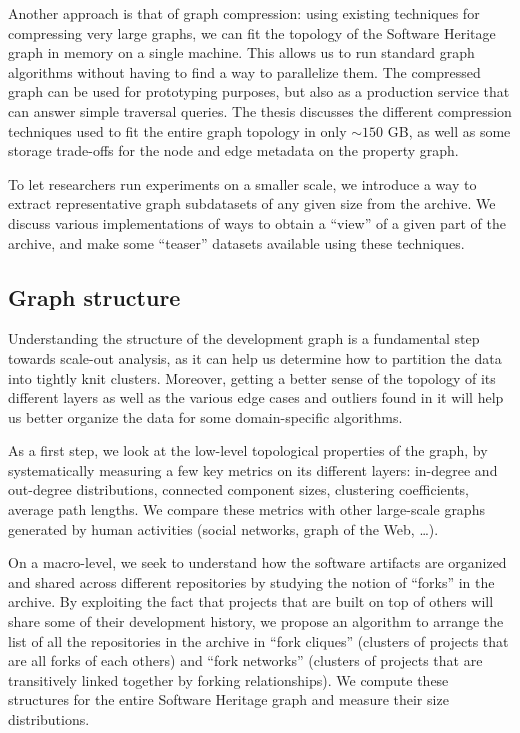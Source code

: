 Another approach is that of graph compression: using existing techniques for
compressing very large graphs, we can fit the topology of the Software Heritage
graph in memory on a single machine. This allows us to run standard graph
algorithms without having to find a way to parallelize them. The compressed
graph can be used for prototyping purposes, but also as a production service
that can answer simple traversal queries. The thesis discusses the different
compression techniques used to fit the entire graph topology in only $\sim150$
GB, as well as some storage trade-offs for the node and edge metadata on the
property graph.

To let researchers run experiments on a smaller scale, we introduce a way to
extract representative graph subdatasets of any given size from the archive. We
discuss various implementations of ways to obtain a ``view'' of a given part of
the archive, and make some ``teaser'' datasets available using these techniques.

\subsection*{Graph structure}

Understanding the structure of the development graph is a fundamental step
towards scale-out analysis, as it can help us determine how to partition the
data into tightly knit clusters. Moreover, getting a better sense of the
topology of its different layers as well as the various edge cases and outliers
found in it will help us better organize the data for some domain-specific
algorithms.

As a first step, we look at the low-level topological properties of the graph,
by systematically measuring a few key metrics on its different layers:
in-degree and out-degree distributions, connected component sizes, clustering
coefficients, average path lengths. We compare these metrics with other
large-scale graphs generated by human activities (social networks, graph of the
Web, …).

On a macro-level, we seek to understand how the software artifacts are
organized and shared across different repositories by studying the notion of
``forks'' in the archive. By exploiting the fact that projects that are built on
top of others will share some of their development history, we propose an
algorithm to arrange the list of all the repositories in the archive in
``fork cliques'' (clusters of projects that are all forks of each others) and
``fork networks'' (clusters of projects that are transitively linked together by
forking relationships). We compute these structures for the entire Software
Heritage graph and measure their size distributions.

